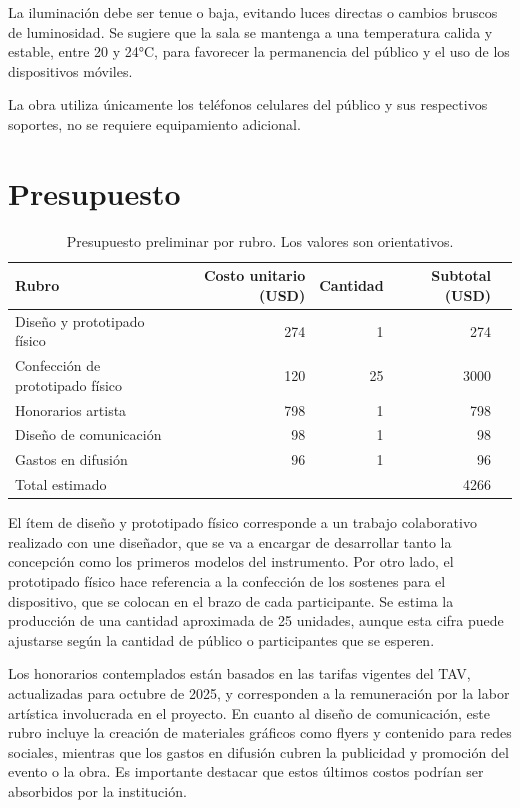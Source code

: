\documentclass[spanish]{report}
\newcommand{\sectionsep}{1cm}
\begin{document}
La iluminación debe ser tenue o baja, evitando luces directas o cambios bruscos de luminosidad. Se sugiere que la sala se mantenga a una temperatura calida y estable, entre 20 y 24°C, para favorecer la permanencia del público y el uso de los dispositivos móviles.

La obra utiliza únicamente los teléfonos celulares del público y sus respectivos soportes, no se requiere equipamiento adicional.


\vspace{\sectionsep}
\section{Presupuesto}
\begin{table}[h!]
    \centering
    \begin{tabular}{lrrrr}
        \hline
        Rubro & Costo unitario (USD) & Cantidad & Subtotal (USD) \\
        \hline
        Diseño y prototipado físico          & 274  & 1   & 274  \\
        Confección de prototipado físico     & 120  & 25  & 3000 \\
        Honorarios artista                   & 798  & 1   & 798  \\
        Diseño de comunicación               & 98   & 1   & 98   \\
        Gastos en difusión                   & 96   & 1   & 96   \\
        \hline
        Total estimado                      &      &     & 4266 \\
        \hline
    \end{tabular}
    \caption{Presupuesto preliminar por rubro. Los valores son orientativos.} 
\end{table}

El ítem de diseño y prototipado físico corresponde a un trabajo colaborativo realizado con une diseñador, que se va a encargar de desarrollar tanto la concepción como los primeros modelos del instrumento. Por otro lado, el prototipado físico hace referencia a la confección de los sostenes para el dispositivo, que se colocan en el brazo de cada participante. Se estima la producción de una cantidad aproximada de 25 unidades, aunque esta cifra puede ajustarse según la cantidad de público o participantes que se esperen.

Los honorarios contemplados están basados en las tarifas vigentes del TAV, actualizadas para octubre de 2025, y corresponden a la remuneración por la labor artística involucrada en el proyecto. En cuanto al diseño de comunicación, este rubro incluye la creación de materiales gráficos como flyers y contenido para redes sociales, mientras que los gastos en difusión cubren la publicidad y promoción del evento o la obra. Es importante destacar que estos últimos costos podrían ser absorbidos por la institución.
\end{document}
